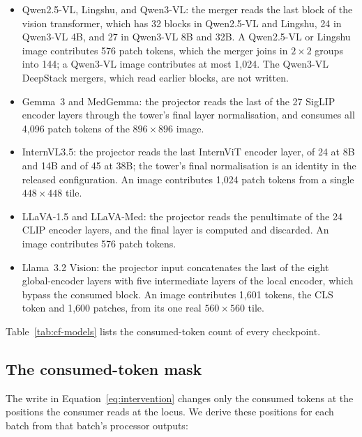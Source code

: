 \documentclass{article}
\begin{document}
\begin{itemize}[leftmargin=*,itemsep=1pt,topsep=2pt]
\item Qwen2.5-VL, Lingshu, and Qwen3-VL: the merger reads the last block of the vision transformer, which has 32 blocks in Qwen2.5-VL and Lingshu, 24 in Qwen3-VL 4B, and 27 in Qwen3-VL 8B and 32B. A Qwen2.5-VL or Lingshu image contributes 576 patch tokens, which the merger joins in $2\times2$ groups into 144; a Qwen3-VL image contributes at most 1{,}024. The Qwen3-VL DeepStack mergers, which read earlier blocks, are not written.
\item Gemma~3 and MedGemma: the projector reads the last of the 27 SigLIP encoder layers through the tower's final layer normalisation, and consumes all 4{,}096 patch tokens of the $896\times896$ image.
\item InternVL3.5: the projector reads the last InternViT encoder layer, of 24 at 8B and 14B and of 45 at 38B; the tower's final normalisation is an identity in the released configuration. An image contributes 1{,}024 patch tokens from a single $448\times448$ tile.
\item LLaVA-1.5 and LLaVA-Med: the projector reads the penultimate of the 24 CLIP encoder layers, and the final layer is computed and discarded. An image contributes 576 patch tokens.
\item Llama~3.2 Vision: the projector input concatenates the last of the eight global-encoder layers with five intermediate layers of the local encoder, which bypass the consumed block. An image contributes 1{,}601 tokens, the CLS token and 1{,}600 patches, from its one real $560\times560$ tile.
\end{itemize}
Table~\ref{tab:cf-models} lists the consumed-token count of every checkpoint.

\subsection{The consumed-token mask}
\label{app:repro-mask}

The write in Equation~\ref{eq:intervention} changes only the consumed tokens at the positions the consumer reads at the locus. We derive these positions for each batch from that batch's processor outputs:
\end{document}
